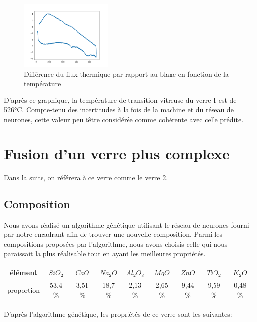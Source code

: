 \documentclass{article}
\begin{document}
\begin{figure}[ht]
    \centering
    \includegraphics[width=0.4\textwidth]{photos/Figure 1.png}
    \caption{Différence du flux thermique par rapport au blanc en fonction de la température}
\end{figure}

D'après ce graphique, la température de transition vitreuse du verre 1 est de 526°C. Compte-tenu des incertitudes à la fois de la machine et du réseau de neurones, cette valeur peu têtre considérée comme cohérente avec celle prédite.

\section{Fusion d'un verre plus complexe}
Dans la suite, on référera à ce verre comme le verre 2.

\subsection{Composition}

Nous avons réalisé un algorithme génétique utilisant le réseau de neurones fourni par notre encadrant afin de trouver une nouvelle composition. 
Parmi les compositions proposées par l'algorithme, nous avons choisis celle qui nous paraissait la plus réalisable tout en ayant les meilleures propriétés.

\begin{table}[ht]
    \centering
    \begin{tabular}{|c|c|c|c|c|c|c|c|c|}
        \hline
        élément &  $SiO_2$ & $CaO$ & $Na_2O$ & $Al_2O_3$ & $MgO$ & $ZnO$ & $TiO_2$ & $K_2O$ \\
        \hline
        proportion & 53,4 \% & 3,51 \% & 18,7 \% & 2,13 \% & 2,65 \% & 9,44 \% & 9,59 \% & 0,48 \%\\
        \hline
        \end{tabular} 
    \end{table}

D'après l'algorithme génétique, les propriétés de ce verre sont les suivantes:
\end{document}
